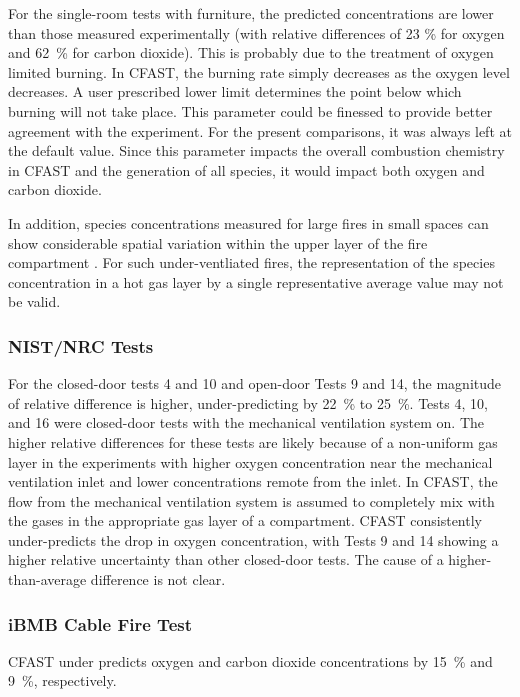 For the single-room tests with furniture, the predicted concentrations are lower than those 
measured experimentally (with relative differences of 23 \% for oxygen and 62~\% for carbon dioxide).  This is probably due to the treatment of oxygen limited burning.  In CFAST, the burning rate simply decreases as the oxygen level decreases.  A user prescribed lower limit determines the point below which burning will not take place.  This parameter could be finessed to provide better agreement with the experiment.  For the present comparisons, it was always left at the default value. Since this parameter impacts the overall combustion chemistry in CFAST and the generation of all species, it would impact both oxygen and carbon dioxide.

In addition, species concentrations measured for large fires in small spaces can show considerable spatial variation within the upper layer of the fire compartment \cite{Bundy:2007}. For such under-ventliated fires, the representation of the species concentration in a hot gas layer by a single representative average value may not be valid.

\subsubsection{NIST/NRC Tests}

For the closed-door tests 4 and 10 and open-door Tests 9 and 14, the magnitude of relative difference is higher, under-predicting by 22~\% to 25~\%.  Tests 4, 10, and 16 were closed-door tests with the mechanical ventilation system on.  The higher relative differences for these tests are likely because of a non-uniform gas layer in the experiments with higher oxygen concentration near the mechanical ventilation inlet and lower concentrations remote from the inlet.  In CFAST, the flow from the mechanical ventilation system is assumed to completely mix with the gases in the appropriate gas layer of a compartment.  CFAST consistently under-predicts the drop in oxygen concentration, with Tests 9 and 14 showing a higher relative uncertainty than other closed-door tests.  The cause of a higher-than-average difference is not clear.

\subsubsection{iBMB Cable Fire Test}

CFAST under predicts oxygen and carbon dioxide concentrations by 15~\% and 9~\%, respectively.

